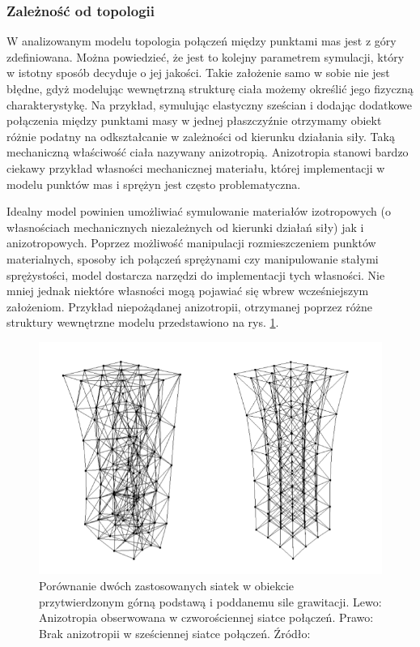 \subsubsection{Zależność od topologii}
W analizowanym modelu topologia połączeń między punktami mas jest z góry zdefiniowana. Można powiedzieć, że jest to kolejny parametrem symulacji, który w istotny sposób decyduje o jej jakości. Takie założenie samo w sobie nie jest błędne, gdyż modelując wewnętrzną strukturę ciała możemy określić jego fizyczną charakterystykę. Na przykład, symulując elastyczny sześcian i dodając dodatkowe połączenia między punktami masy w jednej płaszczyźnie otrzymamy obiekt różnie podatny na odkształcanie w zależności od kierunku działania siły. Taką mechaniczną właściwość ciała nazywany anizotropią. Anizotropia stanowi bardzo ciekawy przykład własności mechanicznej materiału, której implementacji w modelu punktów mas i sprężyn jest często problematyczna. 

Idealny model powinien umożliwiać symulowanie materiałów izotropowych (o własnościach mechanicznych niezależnych od kierunki działań siły) jak i anizotropowych. Poprzez możliwość manipulacji rozmieszczeniem punktów materialnych, sposoby ich połączeń sprężynami czy manipulowanie stałymi sprężystości, model dostarcza narzędzi do implementacji tych własności. Nie mniej jednak niektóre własności mogą pojawiać się wbrew wcześniejszym założeniom. Przykład niepożądanej anizotropii, otrzymanej poprzez różne struktury wewnętrzne modelu przedstawiono na rys. \ref{anizotropia}.

\begin{figure}[ht]
\centering
\includegraphics[scale=0.5]{images/anisotropy.png}
\caption{Porównanie dwóch zastosowanych siatek w obiekcie przytwierdzonym górną podstawą i poddanemu sile grawitacji. Lewo: Anizotropia obserwowana w czworościennej siatce połączeń. Prawo: Brak anizotropii w sześciennej siatce połączeń. Źródło: \cite{ca}}
\label{anizotropia}
\end{figure}

